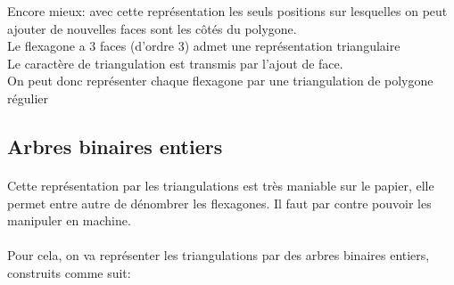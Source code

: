 \documentclass[10pt,a4paper]{article}
\begin{document}
	Encore mieux: avec cette représentation les seuls positions sur lesquelles on peut ajouter de nouvelles faces sont les côtés du polygone.\\
	Le flexagone a 3 faces (d'ordre 3) admet une représentation triangulaire\\
	Le caractère de triangulation est transmis par l'ajout de face.\\
	On peut donc représenter chaque flexagone par une triangulation de polygone régulier	
	\subsection{Arbres binaires entiers}
		\paragraph{}
			Cette représentation par les triangulations est très maniable sur le papier, elle permet entre autre de  dénombrer les flexagones. Il faut par contre pouvoir les manipuler en machine.
		\paragraph*{}
			Pour cela, on va représenter les triangulations par des arbres binaires entiers, construits comme suit:\\
			
			
\end{document}
